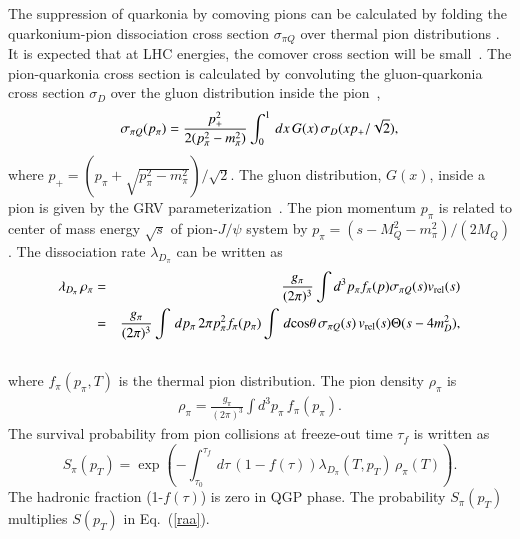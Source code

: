 \documentclass[review]{elsarticle}
\begin{document}
{%
  The suppression of quarkonia by comoving pions can be calculated by folding the quarkonium-pion
dissociation cross section $\sigma_{\pi Q}$ over thermal pion distributions \cite{Vogt:1988fj}. 
It is expected  that at LHC energies, the comover cross section will be small~\cite{Lourenco:2008sk}.
{\color{black}
The pion-quarkonia cross section is calculated by convoluting the gluon-quarkonia cross section $\sigma_D$
over the gluon distribution inside the pion~\cite{Arleo:2001mp},
\begin{equation}
\sigma_{\pi Q} (p_{\pi}) = {p_+^2 \over 2(p_\pi^2 - m_\pi^2)} \int_0^1 \, dx \, G(x) \, \sigma_D(xp_+/\sqrt {2}),
\end{equation}
where $p_+ = (p_\pi + \sqrt{p_\pi^2-m_\pi^2})/\sqrt{2}$. The gluon distribution, $G(x)$, inside a pion is 
given by the GRV parameterization~\cite{Gluck:1991ey}. 
The pion momentum $p_\pi$ is related to center of mass energy $\sqrt{s}$ of pion-$J/\psi$ system by 
$p_\pi = (s-M_Q^2-m_\pi^2)/(2M_Q)$.}
The dissociation rate $\lambda_{D_{\pi}}$  can be written as
\begin{eqnarray}
  \lambda_{D_{\pi}} \, \rho_{\pi} & = & \frac{g_\pi}{(2\pi)^{3}} \int d^{3}p_{\pi} f_{\pi}(p) \sigma_{\pi Q} (s) v_{\rm rel} (s) \\ \nonumber
                              & = &\frac{g_\pi}{(2\pi)^{3}} \int\,dp_{\pi}\,2\pi p_{\pi}^{2} f_{\pi}(p_{\pi}) \int\,d{\rm cos}\theta\,\sigma_{\pi Q}(s) \, v_{\rm rel}(s) \Theta(s-4m_{D}^{2}),  \\\nonumber
\end{eqnarray}
where $f_{\pi}(p_{\pi},T)$ is the thermal pion distribution. The  pion density $\rho_{\pi}$ is 
\begin{eqnarray}
\rho_\pi =\frac{g_\pi}{(2\pi)^{3}} \int d^3p_{\pi} \, f_{\pi}(p_{\pi}). 
\end{eqnarray}
The survival probability from pion collisions at freeze-out time $\tau_f$ is written as
\begin{equation}
S_\pi(p_T) = \exp \left( {-\int_{\tau_0}^{\tau_f} \,d\tau\,(1-f(\tau)) \lambda_{D_{\pi}}(T,p_T)\,\rho_{\pi}(T)} \right).
\end{equation}
The hadronic fraction (1-$f(\tau)$) is zero in QGP phase.
The probability $S_\pi(p_T)$ multiplies $S(p_T)$ in Eq.~(\ref{raa}).



}
\end{document}
